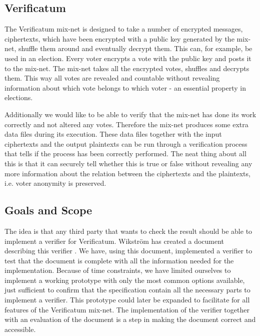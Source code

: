 \subsection{Verificatum}

The Verificatum mix-net is designed to take a number of encrypted
messages, ciphertexts, which have been encrypted with a public key
generated by the mix-net, shuffle them around and eventually decrypt
them. This can, for example, be used in an election. Every voter
encrypts a vote with the public key and posts it to the mix-net. The
mix-net takes all the encrypted votes, shuffles and decrypts
them. This way all votes are revealed and countable without revealing
information about which vote belongs to which voter - an essential
property in elections.

Additionally we would like to be able to verify that the mix-net has
done its work correctly and not altered any votes. Therefore the
mix-net produces some extra data files during its execution. These
data files together with the input ciphertexts and the output
plaintexts can be run through a verification process that tells if the
process has been correctly performed. The neat thing about all this is
that it can securely tell whether this is true or false without
revealing any more information about the relation between the
ciphertexts and the plaintexts, i.e. voter anonymity is preserved.

\subsection{Goals and Scope}

The idea is that any third party that wants to check the result should
be able to implement a verifier for Verificatum. Wikström has created
a document describing this verifier \cite{wikstrom1}. We have, using
this document, implemented a verifier to test that the document is
complete with all the information needed for the
implementation. Because of time constraints, we have limited ourselves
to implement a working prototype with only the most common options
available, just sufficient to confirm that the specification contain
all the necessary parts to implement a verifier. This prototype could
later be expanded to facilitate for all features of the Verificatum
mix-net. The implementation of the verifier together with an
evaluation of the document is a step in making the document correct
and accessible.
